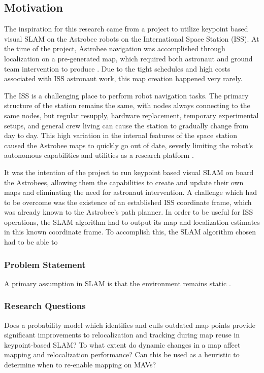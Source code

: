 \subsection{Motivation}

The inspiration for this research came from a project to utilize keypoint based visual SLAM on the Astrobee robots on the International Space Station (ISS). At the time of the project, Astrobee navigation was accomplished through localization on a pre-generated map, which required both astronaut and ground team intervention to produce \cite{soussanAstroLocEfficientRobust2022}. Due to the tight schedules and high costs associated with ISS astronaut work, this map creation happened very rarely.

The ISS is a challenging place to perform robot navigation tasks. The primary structure of the station remains the same, with nodes always connecting to the same nodes, but regular resupply, hardware replacement, temporary experimental setups, and general crew living can cause the station to gradually change from day to day. This high variation in the internal features of the space station caused the Astrobee maps to quickly go out of date, severly limiting the robot's autonomous capabilities and utilities as a research platform \cite{SBOT}.

It was the intention of the project to run keypoint based visual SLAM on board the Astrobees, allowing them the capabilities to create and update their own maps and eliminating the need for astronaut intervention. A challenge which had to be overcome was the existence of an established ISS coordinate frame, which was already known to the Astrobee's path planner. In order to be useful for ISS operations, the SLAM algorithm had to output its map and localization estimates in this known coordinate frame. To accomplish this, the SLAM algorithm chosen had to be able to


\subsubsection{Problem Statement}

A primary assumption in SLAM is that the environment remains static \cite{static environment slam}.

\subsubsection{Research Questions}

Does a probability model which identifies and culls outdated map points provide significant improvements to relocalization and tracking during map reuse in keypoint-based SLAM?
To what extent do dynamic changes in a map affect mapping and relocalization performance?
Can this be used as a heuristic to determine when to re-enable mapping on MAVs?

